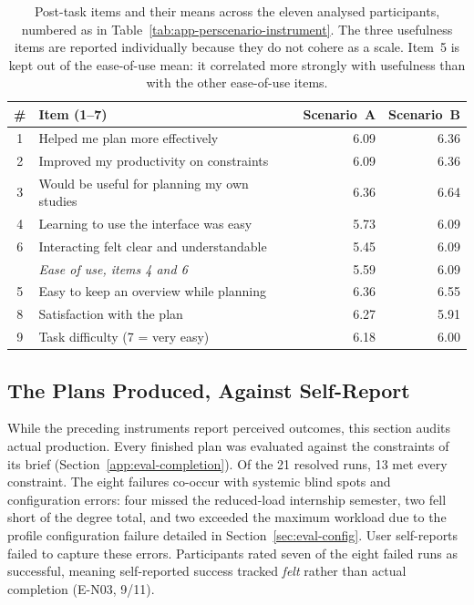 \begin{table}[htpb]
    \centering
    \small
    \begin{tabular}{clrr}
        \toprule
        \# & Item (1--7) & Scenario~A & Scenario~B \\
        \midrule
        1 & Helped me plan more effectively & 6.09 & 6.36 \\
        2 & Improved my productivity on constraints & 6.09 & 6.36 \\
        3 & Would be useful for planning my own studies & 6.36 & 6.64 \\
        \midrule
        4 & Learning to use the interface was easy & 5.73 & 6.09 \\
        6 & Interacting felt clear and understandable & 5.45 & 6.09 \\
          & \emph{Ease of use, items 4 and 6} & 5.59 & 6.09 \\
        \midrule
        5 & Easy to keep an overview while planning & 6.36 & 6.55 \\
        8 & Satisfaction with the plan & 6.27 & 5.91 \\
        9 & Task difficulty (7 = very easy) & 6.18 & 6.00 \\
        \bottomrule
    \end{tabular}
    \caption{Post-task items and their means across the eleven analysed participants, numbered as in Table~\ref{tab:app-perscenario-instrument}. The three usefulness items are reported individually because they do not cohere as a scale. Item~5 is kept out of the ease-of-use mean: it correlated more strongly with usefulness than with the other ease-of-use items.}
    \label{tab:tam}
\end{table}

\subsection{The Plans Produced, Against Self-Report}
\label{sec:eval-effectiveness}

While the preceding instruments report perceived outcomes, this section audits actual production. Every finished plan was evaluated against the constraints of its brief (Section~\ref{app:eval-completion}). Of the 21 resolved runs, 13 met every constraint. The eight failures co-occur with systemic blind spots and configuration errors: four missed the reduced-load internship semester, two fell short of the degree total, and two exceeded the maximum workload due to the profile configuration failure detailed in Section~\ref{sec:eval-config}. User self-reports failed to capture these errors. Participants rated seven of the eight failed runs as successful, meaning self-reported success tracked \emph{felt} rather than actual completion (E-N03, 9/11).

